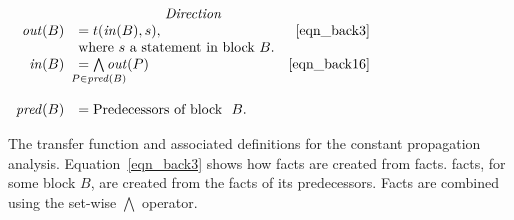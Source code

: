 \begin{myfig}
\begin{math}
\begin{array}{rlr}
      \multicolumn{3}{c}{\emph{Direction}} \\

      \outBa &= t(\inBa, s), \labeleq{eqn_back3} & \eqref{eqn_back3} \\
      & \text{where $s$ a statement in block\ } B.\\
      \inBa &= \bigwedge\limits_{\mathclap{P \in \mathit{pred}(B)}} \outXa{P} \labeleq{eqn_back16} & \eqref{eqn_back16} \\\\ 
      \mfun{pred}(B) &= \text{Predecessors of block }\ B.
    \end{array}
  \end{math}
  \caption{The transfer function and associated definitions for the constant
  propagation analysis. Equation~\eqref{eqn_back3} shows how \out facts are
  created from \inE facts. \InBa facts, for some block $B$, are created from
  the \outBa facts of its predecessors. Facts are combined using the set-wise
  $\bigwedge$ operator.}
\label{fig_back10}
\end{myfig}
